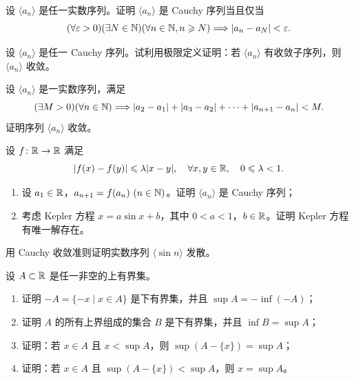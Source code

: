 \begin{exercise}
\item 设 \(\langle a_n\rangle\) 是任一实数序列。证明 \(\langle a_n\rangle\) 是 Cauchy 序列当且仅当
\[
(\forall\varepsilon>0)(\exists N\in\mathbb{N})(\forall n\in\mathbb{N}, n\geqslant N)
\Longrightarrow |a_n-a_N|<\varepsilon.
\]
\end{exercise}

\begin{exercise}
\item 设 \(\langle a_n\rangle\) 是任一 Cauchy 序列。试利用极限定义证明：若 \(\langle a_n\rangle\) 有收敛子序列，则 \(\langle a_n\rangle\) 收敛。
\end{exercise}

\begin{exercise}
\item 设 \(\langle a_n\rangle\) 是一实数序列，满足
\[
(\exists M>0)(\forall n\in\mathbb{N})\Longrightarrow
|a_2-a_1|+|a_3-a_2|+\cdots+|a_{n+1}-a_n|<M.
\]
证明序列 \(\langle a_n\rangle\) 收敛。
\end{exercise}

\begin{exercise}
\item 设 \(f\colon\mathbb{R}\to\mathbb{R}\) 满足
\[
|f(x)-f(y)|\leqslant\lambda|x-y|,\quad \forall x,y\in\mathbb{R},\quad 0\leqslant\lambda<1.
\]
\begin{enumerate}[label=\arabic*)]
  \item 设 \(a_1\in\mathbb{R}\)，\(a_{n+1}=f(a_n)\ (n\in\mathbb{N})\)。证明 \(\langle a_n\rangle\) 是 Cauchy 序列；
  \item 考虑 Kepler 方程 \(x=a\sin x+b\)，其中 \(0<a<1\)，\(b\in\mathbb{R}\)。证明 Kepler 方程有唯一解存在。
\end{enumerate}
\end{exercise}

\begin{exercise}
\item 用 Cauchy 收敛准则证明实数序列 \(\langle\sin n\rangle\) 发散。
\end{exercise}

\begin{exercise}
\item 设 \(A\subset\mathbb{R}\) 是任一非空的上有界集。
\begin{enumerate}[label=\arabic*)]
  \item 证明 \(-A=\{-x\mid x\in A\}\) 是下有界集，并且 \(\sup A=-\inf(-A)\)；
  \item 证明 \(A\) 的所有上界组成的集合 \(B\) 是下有界集，并且 \(\inf B=\sup A\)；
  \item 证明：若 \(x\in A\) 且 \(x<\sup A\)，则 \(\sup(A-\{x\})=\sup A\)；
  \item 证明：若 \(x\in A\) 且 \(\sup(A-\{x\})<\sup A\)，则 \(x=\sup A\)。
\end{enumerate}
\end{exercise}

